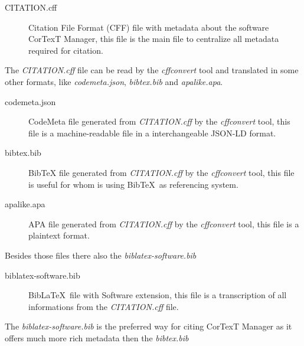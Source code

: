 \documentclass{article}
\begin{document}
\begin{description}
  \item[CITATION.cff] Citation File Format (CFF) file with metadata about the software CorTexT Manager,
    this file is the main file to centralize all metadata required for citation.
\end{description}

The {\em CITATION.cff} file can be read by the {\em cffconvert} tool and
translated in some other formats, like {\em codemeta.json}, {\em bibtex.bib}
and {\em apalike.apa}.

\begin{description}
  \item[codemeta.json] CodeMeta file generated from {\em CITATION.cff} by the
    {\em cffconvert} tool, this file is a machine-readable file in a
    interchangeable JSON-LD format.
  \item[bibtex.bib] BibTeX file generated from {\em CITATION.cff} by the {\em
    cffconvert} tool, this file is useful for whom is using Bib\TeX \ as referencing
    system.
  \item[apalike.apa] APA file generated from {\em CITATION.cff} by the {\em
    cffconvert} tool, this file is a plaintext format.
\end{description}


Besides those files there also the {\em biblatex-software.bib}


\begin{description}
  \item[biblatex-software.bib] Bib\LaTeX \ file with Software extension,
    this file is a transcription of all informations from the {\em CITATION.cff} file.
\end{description}

The {\em biblatex-software.bib} is the preferred way for citing CorTexT Manager
as it offers much more rich metadata then the {\em bibtex.bib}

\printbibliography
\end{document}

